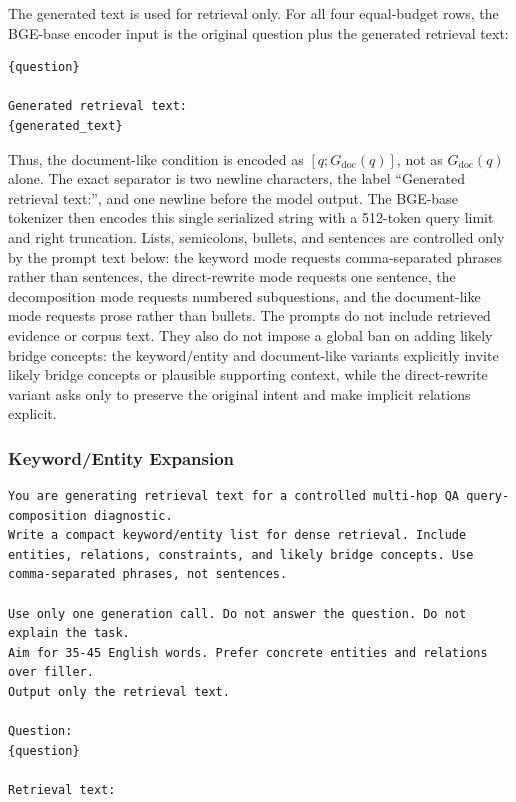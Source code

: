 \documentclass[pdflatex,sn-basic,Numbered]{sn-jnl}
\begin{document}
The generated text is used for retrieval only. For all four equal-budget rows, the BGE-base encoder input is the original question plus the generated retrieval text:
\begingroup\footnotesize
\begin{verbatim}
{question}

Generated retrieval text:
{generated_text}
\end{verbatim}
\endgroup
Thus, the document-like condition is encoded as $[q;G_{\mathrm{doc}}(q)]$, not as $G_{\mathrm{doc}}(q)$ alone. The exact separator is two newline characters, the label ``Generated retrieval text:'', and one newline before the model output. The BGE-base tokenizer then encodes this single serialized string with a 512-token query limit and right truncation. Lists, semicolons, bullets, and sentences are controlled only by the prompt text below: the keyword mode requests comma-separated phrases rather than sentences, the direct-rewrite mode requests one sentence, the decomposition mode requests numbered subquestions, and the document-like mode requests prose rather than bullets. The prompts do not include retrieved evidence or corpus text. They also do not impose a global ban on adding likely bridge concepts: the keyword/entity and document-like variants explicitly invite likely bridge concepts or plausible supporting context, while the direct-rewrite variant asks only to preserve the original intent and make implicit relations explicit.

\subsubsection*{Keyword/Entity Expansion}
\begingroup\footnotesize
\begin{Verbatim}[breaklines=true,breakanywhere=false,breaksymbolleft={},breaksymbolright={}]
You are generating retrieval text for a controlled multi-hop QA query-composition diagnostic.
Write a compact keyword/entity list for dense retrieval. Include entities, relations, constraints, and likely bridge concepts. Use comma-separated phrases, not sentences.

Use only one generation call. Do not answer the question. Do not explain the task.
Aim for 35-45 English words. Prefer concrete entities and relations over filler.
Output only the retrieval text.

Question:
{question}

Retrieval text:
\end{Verbatim}
\endgroup
\end{document}

